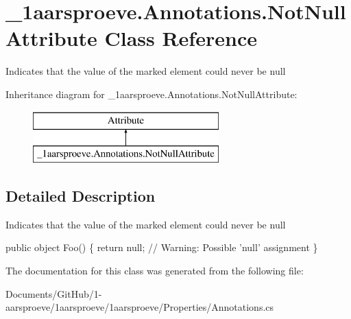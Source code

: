\hypertarget{class__1aarsproeve_1_1_annotations_1_1_not_null_attribute}{}\section{\+\_\+1aarsproeve.\+Annotations.\+Not\+Null\+Attribute Class Reference}
\label{class__1aarsproeve_1_1_annotations_1_1_not_null_attribute}


Indicates that the value of the marked element could never be {\ttfamily null}  


Inheritance diagram for \+\_\+1aarsproeve.\+Annotations.\+Not\+Null\+Attribute\+:\begin{figure}[H]
\begin{center}
\leavevmode
\includegraphics[height=2.000000cm]{class__1aarsproeve_1_1_annotations_1_1_not_null_attribute}
\end{center}
\end{figure}


\subsection{Detailed Description}
Indicates that the value of the marked element could never be {\ttfamily null} 


\begin{DoxyCode}
[NotNull] \textcolor{keyword}{public} \textcolor{keywordtype}{object} Foo() \{
  \textcolor{keywordflow}{return} null; \textcolor{comment}{// Warning: Possible 'null' assignment}
\}
\end{DoxyCode}


The documentation for this class was generated from the following file\+:\begin{DoxyCompactItemize}
\item 
Documents/\+Git\+Hub/1-\/aarsproeve/1aarsproeve/1aarsproeve/\+Properties/Annotations.\+cs\end{DoxyCompactItemize}
